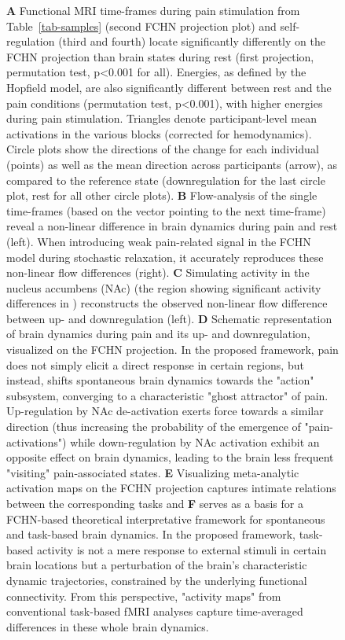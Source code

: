 \documentclass{article}
\begin{document}
\begin{figure}[!htbp]
{\textbf{A} Functional MRI time-frames during pain stimulation from Table~\ref{tab-samples} (second FCHN projection plot)
and self-regulation (third and fourth) locate significantly differently on the FCHN projection than brain states
during rest (first projection, permutation test, p\textless 0.001 for all).  Energies, as defined by the Hopfield model, are also
significantly different between rest and the pain conditions (permutation test, p\textless 0.001), with higher energies during
pain stimulation. Triangles denote participant-level mean activations in the various blocks (corrected for
hemodynamics). Circle plots show the directions of the change for each individual (points) as well as the mean direction
across participants (arrow), as compared to the reference state (downregulation for the last circle plot, rest for all
other circle plots).
\textbf{B} Flow-analysis of the single time-frames (based on the vector pointing to the next time-frame)
reveal a non-linear difference in brain dynamics during pain and rest (left). When introducing weak
pain-related signal in the FCHN model during stochastic relaxation, it accurately reproduces these non-linear flow
differences (right).
\textbf{C} Simulating activity in the nucleus accumbens (NAc) (the region showing significant activity differences in \cite{woo2015distinct}) reconstructs the observed non-linear flow difference between up- and downregulation (left).
\textbf{D} Schematic representation of brain dynamics during pain and its up- and downregulation, visualized on the FCHN
projection. In the proposed framework, pain does not simply elicit a direct response in certain regions, but instead, shifts spontaneous brain dynamics towards the "action" subsystem, converging to a characteristic "ghost
attractor" of pain. Up-regulation by NAc de-activation exerts force towards a similar direction (thus increasing the probability of the emergence of "pain-activations") while down-regulation
by NAc activation exhibit an opposite effect on brain dynamics, leading to the brain less frequent "visiting"
pain-associated states.
\textbf{E} Visualizing meta-analytic activation maps on the FCHN projection captures intimate relations between the corresponding tasks and \textbf{F} serves as a basis for a FCHN-based theoretical interpretative framework for spontaneous and task-based brain dynamics. In the proposed framework, task-based activity is not a mere response to external stimuli in certain brain locations but a perturbation of the brain's characteristic dynamic trajectories, constrained by the underlying functional connectivity. From this perspective, "activity maps" from conventional task-based fMRI analyses capture time-averaged differences in these whole brain dynamics.}
\label{task-validity}
\end{figure}
\end{document}
